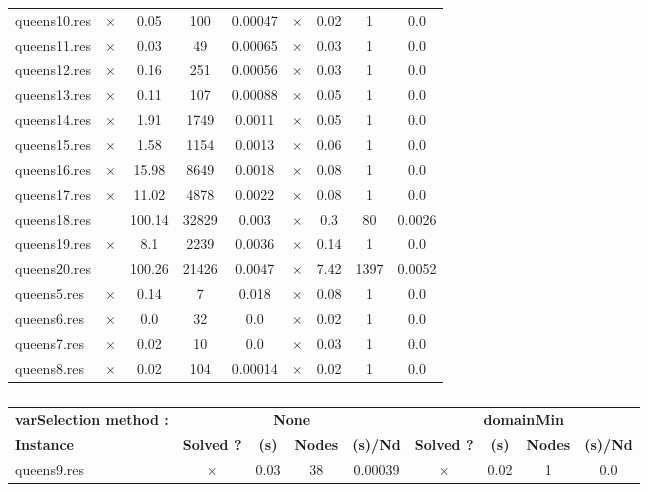 \documentclass[main.tex]{subfiles}
\begin{document}
\begin{landscape}
\begin{center}
\begin{table}[h]
\begin{tabular}{|l|cccc|cccc|}
\\
queens10.res & $\times$ & 0.05 & 100 & 0.00047
 & $\times$ & 0.02 & 1 & 0.0
\\
queens11.res & $\times$ & 0.03 & 49 & 0.00065
 & $\times$ & 0.03 & 1 & 0.0
\\
queens12.res & $\times$ & 0.16 & 251 & 0.00056
 & $\times$ & 0.03 & 1 & 0.0
\\
queens13.res & $\times$ & 0.11 & 107 & 0.00088
 & $\times$ & 0.05 & 1 & 0.0
\\
queens14.res & $\times$ & 1.91 & 1749 & 0.0011
 & $\times$ & 0.05 & 1 & 0.0
\\
queens15.res & $\times$ & 1.58 & 1154 & 0.0013
 & $\times$ & 0.06 & 1 & 0.0
\\
queens16.res & $\times$ & 15.98 & 8649 & 0.0018
 & $\times$ & 0.08 & 1 & 0.0
\\
queens17.res & $\times$ & 11.02 & 4878 & 0.0022
 & $\times$ & 0.08 & 1 & 0.0
\\
queens18.res &  & 100.14 & 32829 & 0.003
 & $\times$ & 0.3 & 80 & 0.0026
\\
queens19.res & $\times$ & 8.1 & 2239 & 0.0036
 & $\times$ & 0.14 & 1 & 0.0
\\
queens20.res &  & 100.26 & 21426 & 0.0047
 & $\times$ & 7.42 & 1397 & 0.0052
\\
queens5.res & $\times$ & 0.14 & 7 & 0.018
 & $\times$ & 0.08 & 1 & 0.0
\\
queens6.res & $\times$ & 0.0 & 32 & 0.0
 & $\times$ & 0.02 & 1 & 0.0
\\
queens7.res & $\times$ & 0.02 & 10 & 0.0
 & $\times$ & 0.03 & 1 & 0.0
\\
queens8.res & $\times$ & 0.02 & 104 & 0.00014
 & $\times$ & 0.02 & 1 & 0.0
\\
\hline\end{tabular}
\end{table}
\end{center}
\end{landscape}
\newpage
\begin{landscape}
\begin{center}
\begin{table}[h]
\centering
\caption{}
\label{}
\renewcommand{\arraystretch}{1.4} 
\begin{tabular}{|l|cccc|cccc|}
	\hline
\textbf{varSelection method :} & \multicolumn{4}{c}{\textbf{None}} & \multicolumn{4}{c}{\textbf{domainMin}}\\
\textbf{Instance}  & \textbf{Solved ?} & \textbf{(s)} & \textbf{Nodes} & \textbf{(s)/Nd} & \textbf{Solved ?} & \textbf{(s)} & \textbf{Nodes} & \textbf{(s)/Nd}\\\hline

queens9.res & $\times$ & 0.03 & 38 & 0.00039
 & $\times$ & 0.02 & 1 & 0.0
\\
\hline\end{tabular}
\end{table}
\end{center}
\end{landscape}
\end{document}
